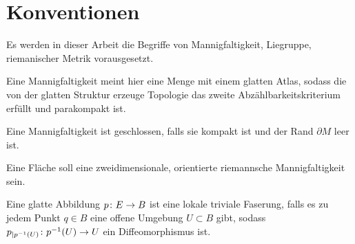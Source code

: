 


\section{Konventionen}
Es werden in dieser Arbeit die Begriffe von Mannigfaltigkeit, Liegruppe,
riemanischer Metrik vorausgesetzt.

Eine Mannigfaltigkeit meint hier eine Menge mit einem glatten Atlas, sodass die von der glatten Struktur erzeuge Topologie das zweite Abzählbarkeitskriterium erfüllt und parakompakt ist.

Eine Mannigfaltigkeit ist geschlossen, falls sie kompakt ist und
der Rand $ \partial M  $ leer ist.

Eine Fläche soll eine zweidimensionale, orientierte riemannsche Mannigfaltigkeit sein.

Eine glatte Abbildung $ p \colon E \rightarrow B $ ist
eine lokale triviale Faserung, falls es zu jedem
Punkt $ q\in B $ eine offene Umgebung $ U\subset B $ gibt, sodass $ p_{|p^{-1}(U)} \colon p^{-1}(U) \rightarrow U $ ein Diffeomorphismus ist.



%
%
%
%
%
%
%


